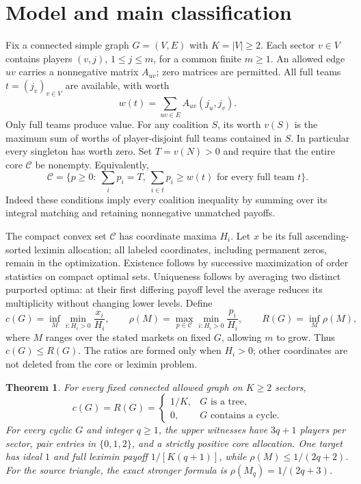 \documentclass[11pt]{article}
\newtheorem{theorem}{Theorem}[section]
\theoremstyle{remark}\newtheorem{remark}[theorem]{Remark}
\newcommand{\core}{\mathcal C}
\begin{document}
\section{Model and main classification}
Fix a connected simple graph $G=(V,E)$ with $K=|V|\ge2$. Each sector $v\in V$
contains players $(v,j)$, $1\le j\le m$, for a common finite $m\ge1$.
An allowed edge $uv$ carries a nonnegative matrix $A_{uv}$; zero matrices
are permitted. All full teams $t=(j_v)_{v\in V}$ are available, with worth
\[
 w(t)=\sum_{uv\in E}A_{uv}(j_u,j_v).
\]
Only full teams produce value. For any coalition $S$, its worth $v(S)$ is the
maximum sum of worths of player-disjoint full teams contained in $S$.
In particular every singleton has worth zero. Set $T=v(N)>0$ and require
that the entire core $\core$ be nonempty. Equivalently,
\begin{equation}\label{eq:core}
 \core=\{p\ge0:\ \sum_i p_i=T,\ \sum_{i\in t}p_i\ge w(t)
                    \text{ for every full team }t\}.
\end{equation}
Indeed these conditions imply every coalition inequality by summing over
its integral matching and retaining nonnegative unmatched payoffs.

The compact convex set $\core$ has coordinate maxima $H_i$. Let $x$ be its
full ascending-sorted leximin allocation; all labeled coordinates, including
permanent zeros, remain in the optimization. Existence follows by successive
maximization of order statistics on compact optimal sets. Uniqueness follows
by averaging two distinct purported optima: at their first differing payoff
level the average reduces its multiplicity without changing lower levels.
Define
\[
 c(G)=\inf_M\min_{i:H_i>0}\frac{x_i}{H_i},\qquad
 \rho(M)=\max_{p\in\core}\min_{i:H_i>0}\frac{p_i}{H_i},\qquad
 R(G)=\inf_M\rho(M),
\]
where $M$ ranges over the stated markets on fixed $G$, allowing $m$ to grow.
Thus $c(G)\le R(G)$. The ratios are formed only when $H_i>0$; other
coordinates are not deleted from the core or leximin problem.

\begin{theorem}\label{thm:main}
For every fixed connected allowed graph on $K\ge2$ sectors,
\[
 c(G)=R(G)=
 \begin{cases}1/K,&G\text{ is a tree},\\0,&G\text{ contains a cycle}.
 \end{cases}
\]
For every cyclic $G$ and integer $q\ge1$, the upper witnesses have $3q+1$
players per sector, pair entries in $\{0,1,2\}$, and a strictly positive
core allocation. One target has ideal $1$ and full leximin payoff
$1/[K(q+1)]$, while $\rho(M)\le1/(2q+2)$.
For the source triangle, the exact stronger formula is
$\rho(M_q)=1/(2q+3)$.
\end{theorem}
\end{document}
